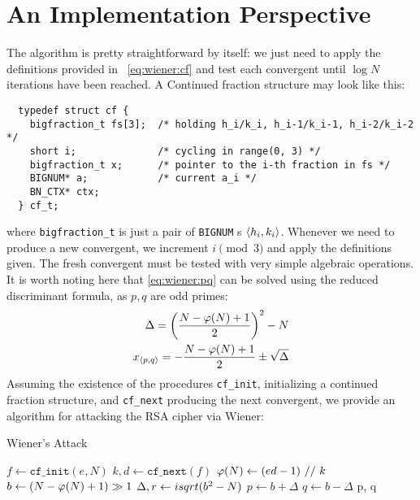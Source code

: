 \section{An Implementation Perspective}

The algorithm is pretty straightforward by itself: we just need to apply the
definitions provided in ~\ref{eq:wiener:cf} and test each convergent until
$\log N$ iterations have been reached.
A Continued fraction structure may look like this:

\begin{verbatim}
  typedef struct cf {
    bigfraction_t fs[3];  /* holding h_i/k_i, h_i-1/k_i-1, h_i-2/k_i-2 */
    short i;              /* cycling in range(0, 3) */
    bigfraction_t x;      /* pointer to the i-th fraction in fs */
    BIGNUM* a;            /* current a_i */
    BN_CTX* ctx;
  } cf_t;
\end{verbatim}
where \texttt{bigfraction\_t} is just a pair of \texttt{BIGNUM} \!s
$\langle h_i, k_i\rangle$. Whenever we need to produce a new convergent, we increment
$i \pmod{3}$ and apply the definitions given. The fresh convergent must be
tested with very simple algebraic operations. It is worth noting here that
\ref{eq:wiener:pq} can be solved using the reduced discriminant formula, as
$p, q$ are odd primes:
\begin{align*}
\Delta = \left( \frac{N-\varphi(N) + 1}{2} \right)^2 - N \\
x_{\langle p , q\rangle} = - \frac{N - \varphi(N) + 1}{2} \pm \sqrt{\Delta}
\end{align*}
Assuming the existence of the procedures \texttt{cf\_init}, initializing a
continued fraction structure, and \texttt{cf\_next} producing the next
convergent, we provide an algorithm for attacking the RSA cipher via Wiener:

\begin{algorithm}[H]
  \caption{Wiener's Attack}
  \label{alg:wiener}
  \begin{algorithmic}[1]
    \State $f \gets  \texttt{cf\_init}(e, N)$
      \State $k, d \gets \texttt{cf\_next}(f)$
        \EndIf
      \State $\varphi(N) \gets (ed - 1)\ //\ k$
        \EndIf
      \State $b \gets (N - \varphi(N) + 1) \gg 1$
      \State $\Delta, r \gets isqrt(b^2 - N)$
        \EndIf
      \State $p \gets b + \Delta$
      \State $q \gets b - \Delta$
      \State {}
    \EndFor
    \State \Return p, q
    \EndFunction
  \end{algorithmic}
\end{algorithm}

